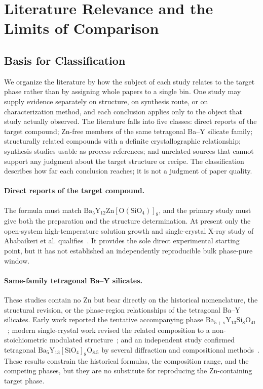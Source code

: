 \section{Literature Relevance and the Limits of Comparison}
\label{sec:evidence-distance}

\subsection{Basis for Classification}

We organize the literature by how the subject of each study relates to the target phase rather than by assigning whole papers to a single bin. One study may supply evidence separately on structure, on synthesis route, or on characterization method, and each conclusion applies only to the object that study actually observed. The literature falls into five classes: direct reports of the target compound; Zn-free members of the same tetragonal Ba--Y silicate family; structurally related compounds with a definite crystallographic relationship; synthesis studies usable as process references; and unrelated sources that cannot support any judgment about the target structure or recipe. The classification describes how far each conclusion reaches; it is not a judgment of paper quality.

\paragraph{Direct reports of the target compound.} The formula must match $\mathrm{Ba_5Y_{12}Zn[O(SiO_4)]_8}$, and the primary study must give both the preparation and the structure determination. At present only the open-system high-temperature solution growth and single-crystal X-ray study of Ababaikeri et al. qualifies~\cite{ababaikeri2024ba5y12zn}. It provides the sole direct experimental starting point, but it has not established an independently reproducible bulk phase-pure window.

\paragraph{Same-family tetragonal Ba--Y silicates.} These studies contain no Zn but bear directly on the historical nomenclature, the structural revision, or the phase-region relationships of the tetragonal Ba--Y silicates. Early work reported the tentative accompanying phase $\mathrm{Ba_{5+x}Y_{13}Si_8O_{41}}$~\cite{kolitsch2009crystal}; modern single-crystal work revised the related composition to a non-stoichiometric modulated structure~\cite{yamane2024synthesis}; and an independent study confirmed tetragonal $\mathrm{Ba_5Y_{13}[SiO_4]_8O_{8.5}}$ by several diffraction and compositional methods~\cite{gulay2024navigation}. These results constrain the historical formulas, the composition range, and the competing phases, but they are no substitute for reproducing the Zn-containing target phase.

